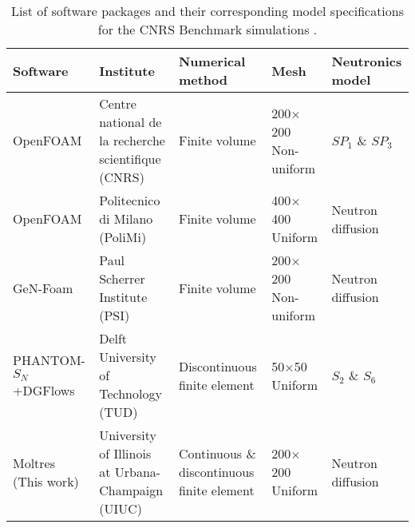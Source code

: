 \begin{landscape}
\begin{table*}[p]
    \caption{List of software packages and their corresponding model
    specifications for the CNRS Benchmark simulations
    \cite{tiberga_results_2020}.}
    \centering
    \begin{tabular}{p{4.2cm} p{7cm} p{3.3cm} p{2cm} p{2.7cm}}
        \toprule
        Software & Institute & Numerical method & Mesh & Neutronics model \\
        \midrule
        OpenFOAM & Centre national de la recherche scientifique (CNRS) & Finite volume & 200$\times$200 \newline Non-uniform & $SP_1$ \& $SP_3$ \\
        OpenFOAM & Politecnico di Milano (PoliMi) & Finite volume & 400$\times$400 \newline Uniform & Neutron diffusion \\
        GeN-Foam & Paul Scherrer Institute (PSI) & Finite volume & 200$\times$200 \newline Non-uniform & Neutron diffusion \\
        PHANTOM-$S_N$+DGFlows & Delft University of Technology (TUD) & Discontinuous finite \newline element & 50$\times$50 \newline Uniform & $S_2$ \& $S_6$ \\
        Moltres (This work) & University of Illinois at Urbana-Champaign (UIUC) & Continuous \& discontinuous finite element & 200$\times$200 \newline Uniform & Neutron diffusion \\
        \bottomrule
    \end{tabular}
    \label{table:software}
\end{table*}
\end{landscape}

\FloatBarrier
